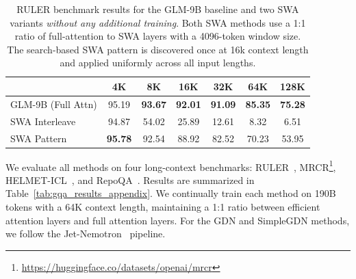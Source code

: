 \documentclass{article}
\theoremstyle{definition}
\begin{document}
\begin{table}[h]
    \small
    \centering
    \caption{RULER benchmark results for the GLM-9B baseline and two SWA variants \emph{without any additional training}. Both SWA methods use a 1:1 ratio of full-attention to SWA layers with a 4096-token window size. The search-based SWA pattern is discovered once at 16k context length and applied uniformly across all input lengths.}
    \label{tab:ruler_results}
    \begin{tabular}{lcccccc}
        \toprule
         & {4K} & {8K} & {16K} & {32K} & {64K} & {128K} \\
        \midrule
        GLM-9B (Full Attn)  & 95.19 & \textbf{93.67} & \textbf{92.01} & \textbf{91.09} & \textbf{85.35} & \textbf{75.28} \\
        SWA Interleave      & 94.87 & 54.02 & 25.89 & 12.61 &  8.32 &  6.51 \\
        SWA Pattern & \textbf{95.78} & 92.54 & 88.92 & 82.52 & 70.23 & 53.95 \\
        \bottomrule
    \end{tabular}
\end{table}

We evaluate all methods on four long-context benchmarks: RULER~\cite{hsiehruler}, MRCR\footnote{\url{https://huggingface.co/datasets/openai/mrcr}}, HELMET-ICL~\cite{yen2024helmet}, and RepoQA~\cite{liu2024repoqa}. Results are summarized in Table~\ref{tab:gqa_results_appendix}. We continually train each method on 190B tokens with a 64K context length, maintaining a 1:1 ratio between efficient attention layers and full attention layers. For the GDN and SimpleGDN methods, we follow the Jet-Nemotron~\cite{gu2025jet} pipeline.
\end{document}
